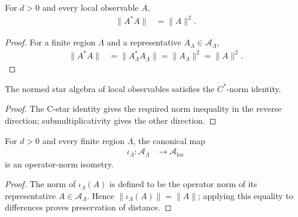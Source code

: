 \begin{lemma}
    \label{lem:qca_algebraic_local_norm_star_mul_self}
    \leanok
    For $d>0$ and every local observable $A$,
    \begin{align}
        \lVert A^*A\rVert & =\lVert A\rVert^2.
    \end{align}
\end{lemma}

\begin{proof}\leanok
    For a finite region $\Lambda$ and a representative
    $A_\Lambda\in\mathcal A_\Lambda$,
    \begin{align}
        \lVert A^*A\rVert
         & =\lVert A_\Lambda^*A_\Lambda\rVert
        =\lVert A_\Lambda\rVert^2
        =\lVert A\rVert^2.
    \end{align}
\end{proof}

\begin{definition}
    \label{def:qca_algebraic_local_cstar_ring}
    \leanok
    The normed star algebra of local observables satisfies the $C^*$-norm identity.
\end{definition}

\begin{proof}\leanok
    The C-star identity gives the required norm inequality in the reverse
    direction; submultiplicativity gives the other direction.
\end{proof}

\begin{lemma}
    \label{lem:qca_local_observable_isometry}
    \leanok
    For $d>0$ and every finite region $\Lambda$, the canonical map
    \begin{align}
        \iota_\Lambda\colon\mathcal A_\Lambda
         & \longrightarrow\mathcal A_{\mathrm{loc}}
    \end{align}
    is an operator-norm isometry.
\end{lemma}

\begin{proof}\leanok
    The norm of $\iota_\Lambda(A)$ is defined to be the operator norm of its
    representative $A\in\mathcal A_\Lambda$.  Hence
    $\lVert\iota_\Lambda(A)\rVert=\lVert A\rVert$; applying this equality to
    differences proves preservation of distance.
\end{proof}

